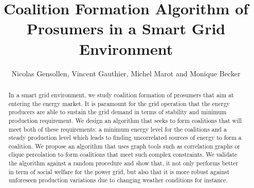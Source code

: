 \documentclass[conference]{IEEEtran}
\begin{document}
%
%
\title{Coalition Formation Algorithm of Prosumers in a Smart Grid Environment}

%
%
\author{Nicolas Gensollen, Vincent Gauthier, Michel Marot and Monique Becker \\
}

\maketitle

%
%
\begin{abstract}
In a smart grid environment, we study coalition formation of prosumers that aim at entering the energy market. It is paramount for the grid operation that the energy producers are able to sustain the grid demand in terms of stability and minimum production requirement. We design an algorithm that seeks to form coalitions that will meet both of these requirements:  a minimum energy level for the coalitions and a steady production level which leads to finding uncorrelated sources of energy  to form a coalition. We propose an algorithm that uses graph tools such as correlation graphs or clique percolation to form coalitions that meet such complex constraints. We validate the algorithm against a random procedure and show that, it not only performs better in term of social welfare for the power grid, but also that it is more robust against unforeseen production variations due to changing weather conditions for instance. 
\end{abstract}

\IEEEpeerreviewmaketitle


%
%
\end{document}
